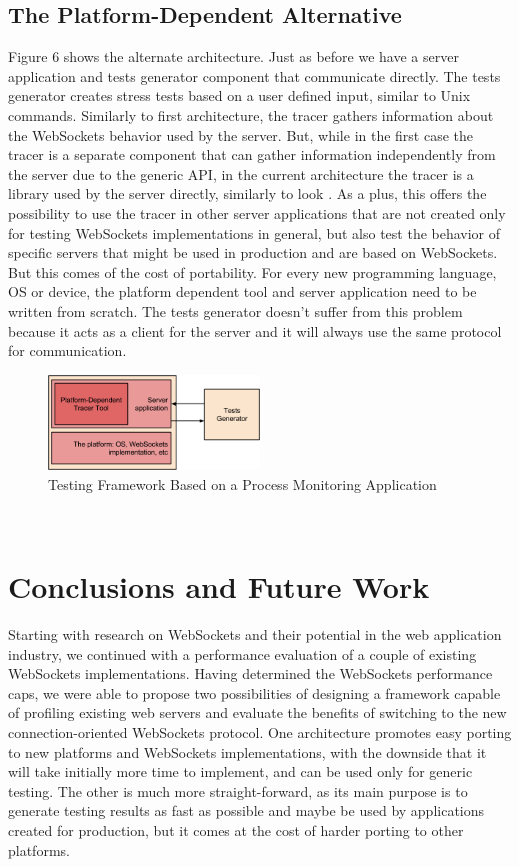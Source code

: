 \documentclass[conference]{IEEEtran}
\begin{document}
\subsection{The Platform-Dependent Alternative}
Figure 6 shows the alternate architecture. Just as before we have a server
application and tests generator component that communicate directly. The tests
generator creates stress tests based on a user defined input, similar to Unix
commands. Similarly to first architecture, the tracer gathers information about
the WebSockets behavior used by the server. But, while in the first case the
tracer is a separate component that can gather information independently from
the server due to the generic API, in the current architecture the tracer is
a library used by the server directly, similarly to look \cite{nodejs-look}.
As a plus, this offers the possibility to use the tracer in other server
applications that are not created only for testing WebSockets implementations
in general, but also test the behavior of specific servers that might be used
in production and are based on WebSockets. But this comes of the cost of
portability. For every new programming language, OS or device, the platform
dependent tool and server application need to be written from scratch. The
tests generator doesn't suffer from this problem because it acts as a client
for the server and it will always use the same protocol for communication.
\begin{frame}{}
  \begin{figure}
    \centering
    \includegraphics[width=0.5\textwidth]{img/architecture2.png}
    \caption{Testing Framework Based on a Process Monitoring Application}
  \end{figure}
\end{frame}
\\

\section{Conclusions and Future Work}
Starting with research on WebSockets and their potential in the web application
industry, we continued with a performance evaluation of a couple of existing
WebSockets implementations. Having determined the WebSockets performance caps,
we were able to propose two possibilities of designing a framework capable of
profiling existing web servers and evaluate the benefits of switching to the new 
connection-oriented WebSockets protocol. One architecture promotes easy porting
to new platforms and WebSockets implementations, with the downside that it will
take initially more time to implement, and can be used only for generic testing.
The other is much more straight-forward, as its main purpose is to generate
testing results as fast as possible and maybe be used by applications created
for production, but it comes at the cost of harder porting to other platforms.
\\
\end{document}

